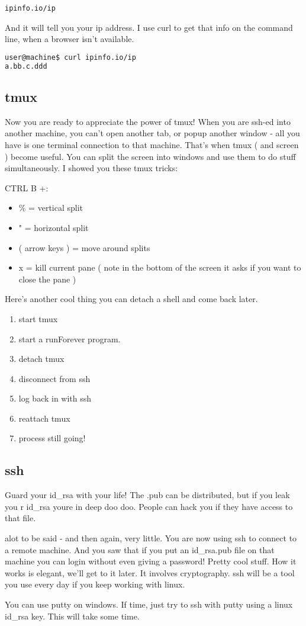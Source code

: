 \documentclass[12pt]{article}
\begin{document}
\begin{verbatim}
ipinfo.io/ip
\end{verbatim}

And it will tell you your ip address. I use curl to get that info on the command line, when a browser isn't available.

\begin{lstlisting}[language=bash]
user@machine$ curl ipinfo.io/ip
a.bb.c.ddd
\end{lstlisting}

\subsection{tmux}
Now you are ready to appreciate the power of tmux! When you are ssh-ed into another machine, you can't open another tab, or popup another window - all you have is one terminal connection to that machine. That's when tmux ( and screen ) become useful. You can split the screen into windows and use them to do stuff simultaneously. I showed you these tmux tricks:

CTRL B +:
\begin{itemize}
\item \% = vertical split
\item " = horizontal split
\item ( arrow keys ) = move around splits
\item x = kill current pane ( note in the bottom of the screen it asks if you want to close the pane )
\end{itemize}

Here's another cool thing you can detach a shell and come back later.

\begin{enumerate}
\item start tmux
\item start a runForever program.
\item detach tmux
\item disconnect from ssh
\item log back in with ssh
\item reattach tmux
\item process still going!
\end{enumerate}

\subsection{ ssh }

Guard your id\_rsa with your life! The .pub can be distributed, but if you leak you r id\_rsa youre in deep doo doo. People can hack you if they have access to that file.

alot to be said - and then again, very little. You are now using ssh to connect to a remote machine. And you saw that if you put an id\_rsa.pub file on that machine you can login without even giving a password! Pretty cool stuff. How it works is elegant, we'll get to it later. It involves cryptography. ssh will be a tool you use every day if you keep working with linux.

You can use putty on windows. If time, just try to ssh with putty using a linux id\_rsa key. This will take some time.
\end{document}
